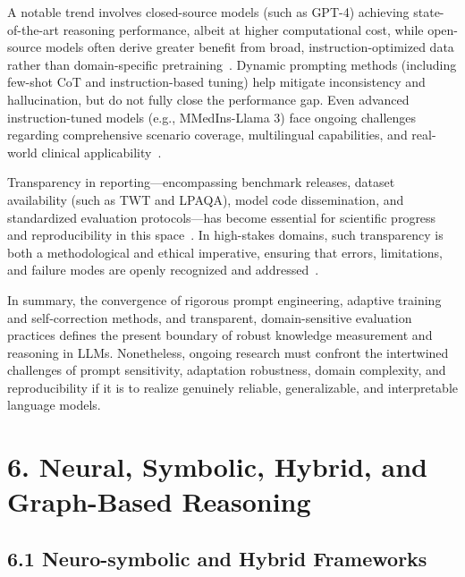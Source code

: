 \documentclass[11pt]{article}
\begin{document}
A notable trend involves closed-source models (such as GPT-4) achieving state-of-the-art reasoning performance, albeit at higher computational cost, while open-source models often derive greater benefit from broad, instruction-optimized data rather than domain-specific pretraining~\cite{94}. Dynamic prompting methods (including few-shot CoT and instruction-based tuning) help mitigate inconsistency and hallucination, but do not fully close the performance gap. Even advanced instruction-tuned models (e.g., MMedIns-Llama 3) face ongoing challenges regarding comprehensive scenario coverage, multilingual capabilities, and real-world clinical applicability~\cite{95}.

Transparency in reporting—encompassing benchmark releases, dataset availability (such as TWT and LPAQA), model code dissemination, and standardized evaluation protocols—has become essential for scientific progress and reproducibility in this space~\cite{96,98,95}. In high-stakes domains, such transparency is both a methodological and ethical imperative, ensuring that errors, limitations, and failure modes are openly recognized and addressed~\cite{94,95,96,98}.

In summary, the convergence of rigorous prompt engineering, adaptive training and self-correction methods, and transparent, domain-sensitive evaluation practices defines the present boundary of robust knowledge measurement and reasoning in LLMs. Nonetheless, ongoing research must confront the intertwined challenges of prompt sensitivity, adaptation robustness, domain complexity, and reproducibility if it is to realize genuinely reliable, generalizable, and interpretable language models.

\section{6. Neural, Symbolic, Hybrid, and Graph-Based Reasoning}

\subsection{6.1 Neuro-symbolic and Hybrid Frameworks}
\end{document}
